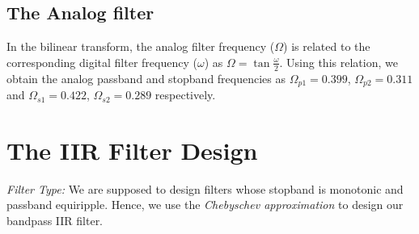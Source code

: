 \documentclass{article}
\begin{document}
\subsection{The Analog filter}
In the bilinear transform, the analog filter frequency ($\Omega$) is related to the corresponding digital filter frequency ($\omega$) as $\Omega = \tan \frac{\omega}{2}$.  Using this relation, we obtain the analog passband and stopband frequencies as $\Omega_{p1} = 0.399$, $\Omega_{p2} = 0.311$ and $\Omega_{s1} = 0.422$, $\Omega_{s2} = 0.289$
respectively.

\section{The IIR Filter Design}
{\em Filter Type:}  We are supposed to design filters whose stopband is monotonic and passband equiripple.  
Hence, we use the {\em Chebyschev approximation} to design our bandpass IIR filter.
\end{document}
